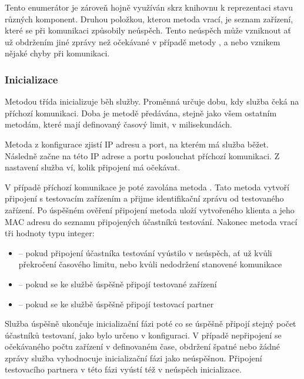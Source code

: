 Tento enumerátor je zároveň hojně využíván skrz knihovnu k reprezentaci stavu různých komponent. Druhou položkou, kterou metoda vrací, je seznam zařízení, které se při komunikaci způsobily neúspěch. 
Tento neúspěch může vzniknout ať už obdržením jiné zprávy než očekávané v případě metody , a nebo vznikem nějaké chyby při komunikaci.

\subsubsection{Inicializace}

Metodou  třída  inicializuje běh služby. Proměnná  určuje dobu, kdy služba čeká na příchozí komunikaci. Doba je metodě předávána, stejně jako všem ostatním metodám, které mají definovaný časový limit, v milisekundách. 

Metoda z konfigurace zjistí IP adresu a port, na kterém má služba běžet. Následně začne na této IP adrese a portu poslouchat příchozí komunikaci. Z nastavení služba ví, kolik připojení má očekávat. 

V případě příchozí komunikace je poté zavolána metoda . Tato metoda vytvoří připojení s testovacím zařízením a přijme identifikační zprávu od testovaného zařízení. Po úspěšném ověření připojení metoda uloží vytvořeného klienta a jeho MAC adresu do seznamu připojených účastníků testování. Nakonec metoda vrací tři hodnoty typu integer:
\begin{itemize}
    \item {} -- pokud připojení účastníka testování vyústilo v neúspěch, ať už kvůli překročení časového limitu, nebo kvůli nedodržení stanovené komunikace
    \item {} -- pokud se ke službě úspěšně připojí testované zařízení
    \item {} -- pokud se ke službě úspěšně připojí testovací partner
\end{itemize}

Služba úspěšně ukončuje inicializační fázi poté co se úspěšně připojí stejný počet účastníků testovaní, jako bylo určeno v konfiguraci. V případě nepřipojení se očekávaného počtu zařízení v definovaném čase, obdržení špatné nebo žádné zprávy služba vyhodnocuje inicializační fázi jako neúspěšnou. Připojení testovacího partnera v této fázi vyústí též v neúspěch inicializace.

